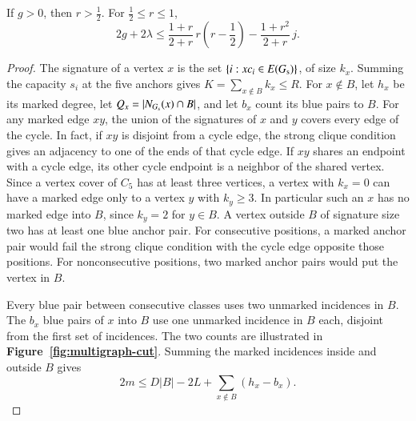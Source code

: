 \begin{lemma}\label{lem:multigraph-cycle-counts}
If $g>0$, then $r>\frac{1}{2}$. For $\frac{1}{2}\le r\le1$,
\begin{equation}\label{eq:multi-joint}
 2g+2\lambda\le
 \frac{1+r}{2+r}\,r\left(r-\frac{1}{2}\right)
 -\frac{1+r^2}{2+r}\,j.
\end{equation}
\end{lemma}
\begin{proof}
The signature of a vertex $x$ is the set $\{i:xc_i\in E(G_{\rm s})\}$,
of size $k_x$. Summing the capacity $s_i$ at the five anchors gives
$K=\sum_{x\notin B}k_x\le R$. For $x\notin B$, let $h_x$ be its marked
degree, let $Q_x=|N_{G_{\rm s}}(x)\cap B|$, and let $b_x$ count its
blue pairs to $B$. For any marked edge $xy$, the union of the
signatures of $x$ and $y$ covers every edge of the cycle. In fact,
if $xy$ is disjoint from a cycle edge, the strong clique condition
gives an adjacency to one of the ends of that cycle edge. If $xy$
shares an endpoint with a cycle edge, its other cycle endpoint is
a neighbor of the shared vertex. Since a vertex cover of $C_5$ has
at least three vertices, a vertex with $k_x=0$ can have a marked
edge only to a vertex $y$ with $k_y\ge3$. In particular such an $x$
has no marked edge into $B$, since $k_y=2$ for $y\in B$.
A vertex outside $B$ of signature size two has at least one blue anchor pair. For
consecutive positions, a marked anchor pair would fail the strong
clique condition with the cycle edge opposite those positions. For
nonconsecutive positions, two marked anchor pairs would put the vertex
in $B$.

Every blue pair between consecutive classes uses two unmarked incidences
in $B$. The $b_x$ blue pairs of $x$ into $B$ use one unmarked incidence
in $B$ each, disjoint from the first set of incidences. The two
counts are illustrated in \textbf{Figure~\ref{fig:multigraph-cut}}.
Summing the marked incidences inside and outside $B$ gives
\begin{equation}\label{eq:multi-core-cut}
 2m\le D|B|-2L+\sum_{x\notin B}(h_x-b_x).
\end{equation}




\end{proof}
